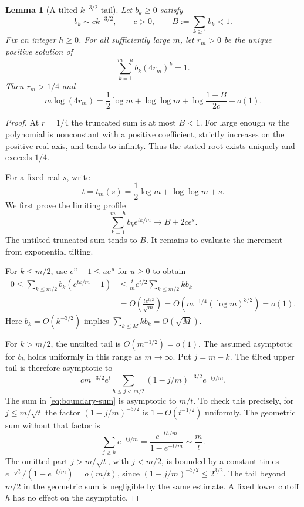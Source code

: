 \documentclass[11pt,a4paper]{article}
\newtheorem{lemma}[lemma]{Lemma}
\theoremstyle{definition}\newaliascnt{definition}{theorem}
\theoremstyle{remark}\newaliascnt{remark}{theorem}
\begin{document}
\begin{lemma}[A tilted $k^{-3/2}$ tail]\label{lem:tailroot}
Let $b_k\ge0$ satisfy
\[
 b_k\sim c k^{-3/2},\qquad c>0,\qquad B:=\sum_{k\ge1}b_k<1.
\]
Fix an integer $h\ge0$. For all sufficiently large $m$, let $r_m>0$ be the
unique positive solution of
\[
 \sum_{k=1}^{m-h}b_k(4r_m)^k=1.
\]
Then $r_m>1/4$ and
\begin{equation}
 m\log(4r_m)
 =\frac12\log m+\log\log m+
       \log\frac{1-B}{2c}+o(1).
 \label{eq:tailroot}
\end{equation}
\end{lemma}
\begin{proof}
At $r=1/4$ the truncated sum is at most $B<1$. For large enough $m$ the
polynomial is nonconstant with a positive coefficient, strictly increases
on the positive real axis, and tends to infinity. Thus the stated root
exists uniquely and exceeds $1/4$.

For a fixed real $s$, write
\[
 t=t_m(s)=\frac12\log m+\log\log m+s.
\]
We first prove the limiting profile
\begin{equation}
 \sum_{k=1}^{m-h}b_ke^{tk/m}\longrightarrow B+2ce^s.
 \label{eq:profile}
\end{equation}
The untilted truncated sum tends to $B$. It remains to evaluate the
increment from exponential tilting.

For $k\le m/2$, use $e^u-1\le ue^u$ for $u\ge0$ to obtain
\begin{align*}
 0\le\sum_{k\le m/2}b_k(e^{tk/m}-1)
 &\le \frac{t}{m}e^{t/2}\sum_{k\le m/2}k b_k\\
 &=O\left(\frac{t e^{t/2}}{\sqrt m}\right)
  =O\left(m^{-1/4}(\log m)^{3/2}\right)=o(1).
\end{align*}
Here $b_k=O(k^{-3/2})$ implies $\sum_{k\le M}k b_k=O(\sqrt M)$.

For $k>m/2$, the untilted tail is $O(m^{-1/2})=o(1)$. The assumed asymptotic
for $b_k$ holds uniformly in this range as $m\to\infty$. Put $j=m-k$.
The tilted upper tail is therefore asymptotic to
\begin{equation}
 c m^{-3/2}e^t
 \sum_{h\le j<m/2}(1-j/m)^{-3/2}e^{-tj/m}.
 \label{eq:boundary-sum}
\end{equation}
The sum in \eqref{eq:boundary-sum} is asymptotic to $m/t$.
To check this precisely, for $j\le m/\sqrt t$ the factor
$(1-j/m)^{-3/2}$ is $1+O(t^{-1/2})$ uniformly. The geometric sum without
that factor is
\[
 \sum_{j\ge h}e^{-tj/m}
 =\frac{e^{-th/m}}{1-e^{-t/m}}\sim\frac{m}{t}.
\]
The omitted part $j>m/\sqrt t$, with $j<m/2$, is bounded by a constant times
$e^{-\sqrt t}/(1-e^{-t/m})=o(m/t)$, since $(1-j/m)^{-3/2}\le2^{3/2}$.
The tail beyond $m/2$ in the geometric sum is negligible by the same
estimate. A fixed lower cutoff $h$ has no effect on the asymptotic.


\end{proof}
\end{document}
